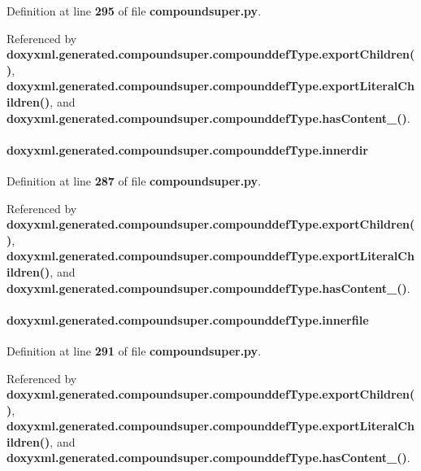 Definition at line {\bf 295} of file {\bf compoundsuper.\+py}.



Referenced by {\bf doxyxml.\+generated.\+compoundsuper.\+compounddef\+Type.\+export\+Children()}, {\bf doxyxml.\+generated.\+compoundsuper.\+compounddef\+Type.\+export\+Literal\+Children()}, and {\bf doxyxml.\+generated.\+compoundsuper.\+compounddef\+Type.\+has\+Content\+\_\+()}.

\paragraph[{innerdir}]{\setlength{\rightskip}{0pt plus 5cm}doxyxml.\+generated.\+compoundsuper.\+compounddef\+Type.\+innerdir}\label{classdoxyxml_1_1generated_1_1compoundsuper_1_1compounddefType_a2815b8e5ad80b8b1331f316eacd33535}


Definition at line {\bf 287} of file {\bf compoundsuper.\+py}.



Referenced by {\bf doxyxml.\+generated.\+compoundsuper.\+compounddef\+Type.\+export\+Children()}, {\bf doxyxml.\+generated.\+compoundsuper.\+compounddef\+Type.\+export\+Literal\+Children()}, and {\bf doxyxml.\+generated.\+compoundsuper.\+compounddef\+Type.\+has\+Content\+\_\+()}.

\paragraph[{innerfile}]{\setlength{\rightskip}{0pt plus 5cm}doxyxml.\+generated.\+compoundsuper.\+compounddef\+Type.\+innerfile}\label{classdoxyxml_1_1generated_1_1compoundsuper_1_1compounddefType_a6b59be6dd699b5c7e7807b5039b7a98f}


Definition at line {\bf 291} of file {\bf compoundsuper.\+py}.



Referenced by {\bf doxyxml.\+generated.\+compoundsuper.\+compounddef\+Type.\+export\+Children()}, {\bf doxyxml.\+generated.\+compoundsuper.\+compounddef\+Type.\+export\+Literal\+Children()}, and {\bf doxyxml.\+generated.\+compoundsuper.\+compounddef\+Type.\+has\+Content\+\_\+()}.

